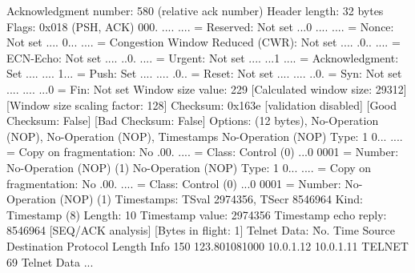     Acknowledgment number: 580    (relative ack number)
    Header length: 32 bytes
    Flags: 0x018 (PSH, ACK)
        000. .... .... = Reserved: Not set
        ...0 .... .... = Nonce: Not set
        .... 0... .... = Congestion Window Reduced (CWR): Not set
        .... .0.. .... = ECN-Echo: Not set
        .... ..0. .... = Urgent: Not set
        .... ...1 .... = Acknowledgment: Set
        .... .... 1... = Push: Set
        .... .... .0.. = Reset: Not set
        .... .... ..0. = Syn: Not set
        .... .... ...0 = Fin: Not set
    Window size value: 229
    [Calculated window size: 29312]
    [Window size scaling factor: 128]
    Checksum: 0x163e [validation disabled]
        [Good Checksum: False]
        [Bad Checksum: False]
    Options: (12 bytes), No-Operation (NOP), No-Operation (NOP), Timestamps
        No-Operation (NOP)
            Type: 1
                0... .... = Copy on fragmentation: No
                .00. .... = Class: Control (0)
                ...0 0001 = Number: No-Operation (NOP) (1)
        No-Operation (NOP)
            Type: 1
                0... .... = Copy on fragmentation: No
                .00. .... = Class: Control (0)
                ...0 0001 = Number: No-Operation (NOP) (1)
        Timestamps: TSval 2974356, TSecr 8546964
            Kind: Timestamp (8)
            Length: 10
            Timestamp value: 2974356
            Timestamp echo reply: 8546964
    [SEQ/ACK analysis]
        [Bytes in flight: 1]
Telnet
    Data: \r

No.     Time           Source                Destination           Protocol Length Info
    150 123.801081000  10.0.1.12             10.0.1.11             TELNET   69     Telnet Data ...

